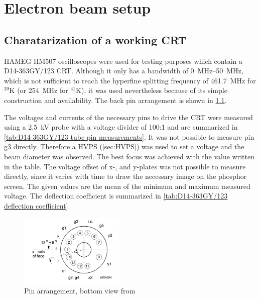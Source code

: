 \chapter{Electron beam setup}
\label{ch:Electron beam setup}

\section{Charatarization of a working CRT}
\label{sec:Charatarization of a working CRT}

HAMEG HM507 oscilloscopes \autocite{HM507-manual} were used for testing purposes which contain a D14-363GY/123\autocite{D14363GY123-manual} CRT. Although it only has a bandwidth of \SIrange{0}{50}{\mega\hertz}, which is not sufficient to reach the hyperfine splitting frequency of \SI{461.7}{\mega\hertz} for $^{39}\mathrm{K}$\cite{tiecke:potassium-properties} (or \SI{254}{\mega\hertz} for $^{41}\mathrm{K}$), it was used nevertheless because of its simple construction and availability. The back pin arrangement is shown in \cref{fig:pin arrangement}.

The voltages and currents of the necessary pins to drive the CRT were measured using a \SI{2.5}{\kilo\volt} probe with a voltage divider of 100:1 and are summarized in \cref{tab:D14-363GY/123 tube pin measurements}. It was not possible to measure pin g3 directly. Therefore a HVPS (\cref{sec:HVPS}) was used to set a voltage and the beam diameter was observed. The best focus was achieved with the value written in the table. The voltage offset of x-, and y-plates was not possible to measure directly, since it varies with time to draw the necessary image on the phosphor screen. The given values are the mean of the minimum and maximum measured voltage. The deflection coefficient is summarized in \cref{tab:D14-363GY/123 deflection coefficient}.

\begin{figure}[ht]
	\centering
	\includegraphics[width=5cm]{./Chapters/e-beam-setup/pin arrangement}
	\caption{Pin arrangement, bottom view from \autocite{D14363GY123-manual}}
	\label{fig:pin arrangement}
\end{figure}


